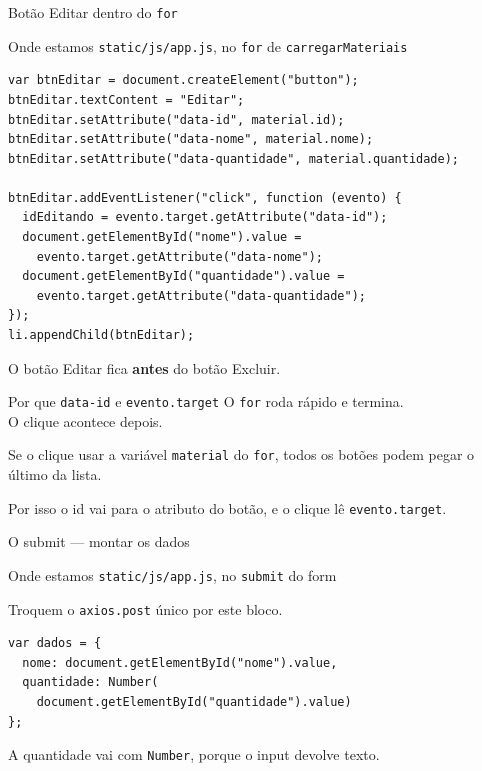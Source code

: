\documentclass[aspectratio=169,11pt]{beamer}
\newcommand{\onde}[1]{%
  \begin{block}{Onde estamos}
    #1
  \end{block}
}
\begin{document}
\begin{frame}[fragile]{Botão Editar dentro do \texttt{for}}
  \onde{\texttt{static/js/app.js}, no \texttt{for} de
        \texttt{carregarMateriais}}

\begin{lstlisting}[basicstyle=\ttfamily\scriptsize]
var btnEditar = document.createElement("button");
btnEditar.textContent = "Editar";
btnEditar.setAttribute("data-id", material.id);
btnEditar.setAttribute("data-nome", material.nome);
btnEditar.setAttribute("data-quantidade", material.quantidade);

btnEditar.addEventListener("click", function (evento) {
  idEditando = evento.target.getAttribute("data-id");
  document.getElementById("nome").value =
    evento.target.getAttribute("data-nome");
  document.getElementById("quantidade").value =
    evento.target.getAttribute("data-quantidade");
});
li.appendChild(btnEditar);
\end{lstlisting}

  O botão Editar fica \textbf{antes} do botão Excluir.
\end{frame}

\begin{frame}{Por que \texttt{data-id} e \texttt{evento.target}}
  O \texttt{for} roda rápido e termina.\\
  O clique acontece depois.

  \vspace{0.5em}
  Se o clique usar a variável \texttt{material} do \texttt{for},
  todos os botões podem pegar o último da lista.

  \vspace{0.5em}
  Por isso o id vai para o atributo do botão,
  e o clique lê \texttt{evento.target}.
\end{frame}

\begin{frame}[fragile]{O submit --- montar os dados}
  \onde{\texttt{static/js/app.js}, no \texttt{submit} do form}

  Troquem o \texttt{axios.post} único por este bloco.

\begin{lstlisting}[basicstyle=\ttfamily\footnotesize]
var dados = {
  nome: document.getElementById("nome").value,
  quantidade: Number(
    document.getElementById("quantidade").value)
};
\end{lstlisting}

  A quantidade vai com \texttt{Number}, porque o input devolve texto.
\end{frame}
\end{document}
